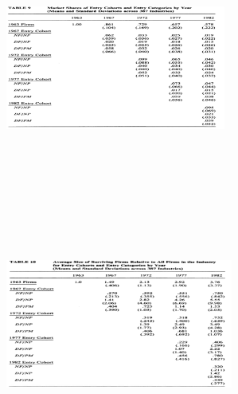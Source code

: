 \documentclass[dvipdfmx,12pt]{beamer}
\begin{document}
\begin{frame}

\begin{center}

\includegraphics[width=7.25cm,height=8cm]{DRS_T9.pdf}

\end{center}

\end{frame}

\begin{frame}

\begin{center}

\includegraphics[width=7.5cm,height=8cm]{DRS_T10.pdf}

\end{center}

\end{frame}
\end{document}
